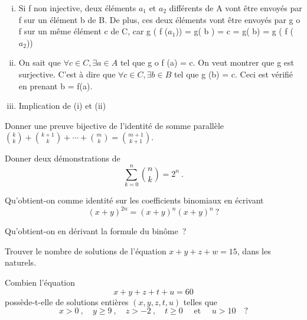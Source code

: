 \begin{enumerate}[(i)]
	\item Si f non injective, deux éléments $a_{1}$ et $a_{2}$ différents de A vont être envoyés par f sur un élément b de B. De plus, ces deux éléments vont être envoyés par g o f sur un même élément c de C, car g ( f ($a_1$)) = g( b ) = c = g( b) = g ( f ( $a_2$))
	\item On sait que $\forall c \in C , \exists a \in A$ tel que g o f (a) = c. 
		On veut montrer que g est surjective. C'est à dire que $\forall c \in C, \exists b \in B$ tel que g (b) = c. 
		Ceci est vérifié en prenant b = f(a).
	\item Implication de (i) et (ii)
\end{enumerate}


\begin{exo}
Donner une preuve bijective de l'identit\'e de somme parall\`ele ${k \choose k} + {k+1 \choose k} + \cdots + {m \choose k} = {m+1 \choose k+1}$.
\end{exo}


\begin{exo}
Donner deux d\'emonstrations de
$$
\sum_{k=0}^n {n \choose k} = 2^n\ .
$$
\end{exo}


\begin{exo}
Qu'obtient-on comme identit\'e sur les coefficients binomiaux en \'ecrivant
$$
(x+y)^{2n} = (x+y)^n(x+y)^n\ ?
$$
\end{exo}


\begin{exo}
Qu'obtient-on en d\'erivant la formule du bin\^ome~?
\end{exo}


\begin{exo}
Trouver le nombre de solutions de l'\'equation $x + y + z + w = 15$, dans les naturels.
\end{exo}


\begin{exo} 
Combien l'\'equation
$$
x + y + z + t + u = 60
$$
poss\`ede-t-elle de solutions enti\`eres $(x,y,z,t,u)$ telles que
$$
x > 0\ ,\quad y \geqslant 9\ , \quad z > -2\ , \quad t \geqslant 0 \quad \textrm{ et }  \quad u > 10 \quad ?
$$
\end{exo}

